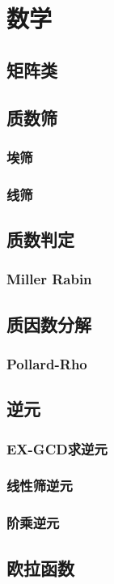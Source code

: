 \documentclass[twocolumn,a4]{article}
\newcommand{\addcpp}[1]{}
\begin{document}
\section{数学}
	\subsection{矩阵类}
	\subsection{质数筛}
		\subsubsection{埃筛}
		\subsubsection{线筛}
	\subsection{质数判定}
		\subsubsection{Miller Rabin}
	\subsection{质因数分解}
		\subsubsection{Pollard-Rho}
	\subsection{逆元}
		\subsubsection{EX-GCD求逆元}
		\subsubsection{线性筛逆元}
		\subsubsection{阶乘逆元}
	\subsection{欧拉函数}
\end{document}
